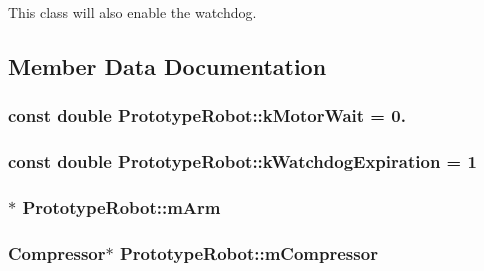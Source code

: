 \-This class will also enable the watchdog. 

\subsection{\-Member \-Data \-Documentation}
\hypertarget{class_prototype_robot_a45c884944b8e6e8721b323b65414449a}{
\subsubsection[{k\-Motor\-Wait}]{\setlength{\rightskip}{0pt plus 5cm}const double {\bf \-Prototype\-Robot\-::k\-Motor\-Wait} = 0.}}\label{class_prototype_robot_a45c884944b8e6e8721b323b65414449a}
\hypertarget{class_prototype_robot_a2f15dd7940c8ac7584e76669cbf25b72}{
\subsubsection[{k\-Watchdog\-Expiration}]{\setlength{\rightskip}{0pt plus 5cm}const double {\bf \-Prototype\-Robot\-::k\-Watchdog\-Expiration} = 1}}\label{class_prototype_robot_a2f15dd7940c8ac7584e76669cbf25b72}
\hypertarget{class_prototype_robot_a36d9223bd2fe9e9b657f6752ec2fbe94}{
\subsubsection[{m\-Arm}]{$\ast$ {\bf \-Prototype\-Robot\-::m\-Arm}}}\label{class_prototype_robot_a36d9223bd2fe9e9b657f6752ec2fbe94}
\hypertarget{class_prototype_robot_a5478de9598e5f16cc8f74f60cf854152}{
\subsubsection[{m\-Compressor}]{\setlength{\rightskip}{0pt plus 5cm}\-Compressor$\ast$ {\bf \-Prototype\-Robot\-::m\-Compressor}}}\label{class_prototype_robot_a5478de9598e5f16cc8f74f60cf854152}
